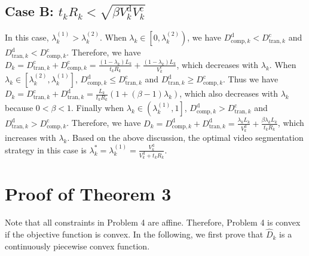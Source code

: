 \documentclass[journal,draftcls,onecolumn,12pt,twoside]{IEEEtran}
\begin{document}
\begin{appendices}
\subsection{Case B: $t_k R_k < \sqrt{\beta V_k^{\text{d}}V_k^{\text{c}}}$}
In this case, $\lambda_k^{(1)}>\lambda_k^{(2)}$. When $\lambda_k\in \left[0,\lambda_k^{(2)}\right)$, we have $D_{{\text{comp},k}}^{\text{d}}< D_{{\text{tran},k}}^{\text{c}}$ and $D_{{\text{tran},k}}^{\text{d}}< D_{{\text{comp},k}}^{\text{c}}$. Therefore, we have $D_k=D_{{\text{tran},k}}^{\text{c}}+D_{{\text{comp},k}}^{\text{c}}=\frac{\left(1-\lambda_k\right)L_k}{t_k R_k}+\frac{(1-\lambda_k)L_k}{V_k^{\text{c}}}$, which decreases with $\lambda_k$.
When $\lambda_k\in\left[\lambda_k^{(2)},\lambda_k^{(1)}\right]$, $D_{{\text{comp},k}}^{\text{d}} \le D_{{\text{tran},k}}^{\text{c}}$ and $D_{{\text{tran},k}}^{\text{d}} \ge D_{{\text{comp},k}}^{\text{c}}$. Thus we have $D_k=D_{{\text{tran},k}}^{\text{c}}+D_{{\text{tran},k}}^{\text{d}} = \frac{L_k}{ t_k R_k}\left(1+\left(\beta-1\right)\lambda_k\right)$, which also decreases with $\lambda_k$ because $0<\beta<1$. Finally when $\lambda_k\in\left(\lambda_k^{(1)},1\right]$, $D_{{\text{comp},k}}^{\text{d}} > D_{{\text{tran},k}}^{\text{c}}$ and $D_{{\text{tran},k}}^{\text{d}} > D_{{\text{comp},k}}^{\text{c}}$. Therefore, we have $D_k=D_{{\text{comp},k}}^{\text{d}}+D_{{\text{tran},k}}^{\text{d}}=\frac{\lambda_k L_k}{V_k^{\text{d}}}+\frac{\beta \lambda_k L_k}{t_k R_k}$, which increases with $\lambda_k$. Based on the above discussion, the optimal video segmentation strategy in this case is $\lambda_k^*=\lambda_k^{(1)} =\frac{V_k^{\text{d}}}{V_k^{\text{d}}+t_kR_k}$.

\section{Proof of Theorem 3}
Note that all constraints in Problem 4 are affine. Therefore, Problem 4 is convex if the objective function is convex. In the following, we first prove that $\widehat{D}_k$ is a continuously piecewise convex function.


\end{appendices}
\end{document}
